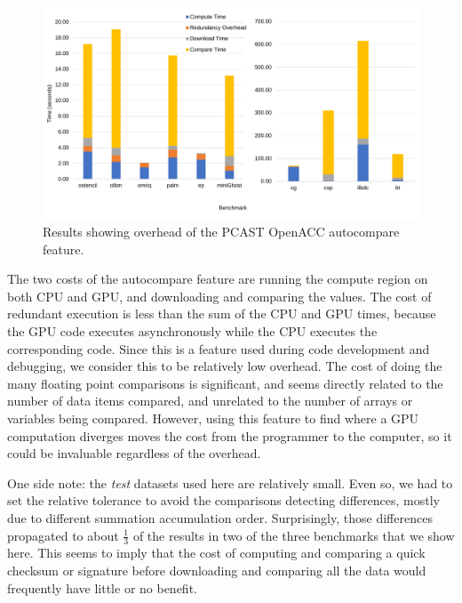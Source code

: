 
\begin{figure}[t]
    \centering
    \includegraphics [width=1\linewidth] {npic3.pdf}
    \caption{Results showing overhead of the PCAST OpenACC autocompare feature.}
    \label{fig:sle_figure}
\end{figure}


The two costs of the autocompare feature are running the compute region on both CPU and GPU, and downloading and comparing the values.
The cost of redundant execution is less than the sum of the CPU and GPU times, because the GPU code executes asynchronously while the CPU executes the corresponding code.
Since this is a feature used during code development and debugging, we consider this to be relatively low overhead.
The cost of doing the many floating point comparisons is significant, and seems directly related to the number of data items compared, and unrelated to the number of arrays or variables being compared.
However, using this feature to find where a GPU computation diverges moves the cost from the programmer to the computer, so it could be invaluable regardless of the overhead.

One side note: the \emph{test} datasets used here are relatively small.
Even so, we had to set the relative tolerance to avoid the comparisons detecting differences, mostly due to different summation accumulation order.
Surprisingly, those differences propagated to about $\frac{1}{3}$ of the results in two of the three benchmarks that we show here.
This seems to imply that the cost of computing and comparing a quick checksum or signature before downloading and comparing all the data would frequently have little or no benefit.
